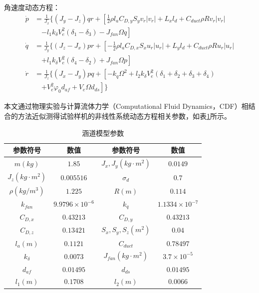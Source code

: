 角速度动态方程：
\begin{equation}
    \begin{aligned}
        \dot{p}  &=\frac{1}{J_x}\Bigg\{ (J_y-J_z)qr+
        \left[\frac{1}{2}\rho{l_a} C_{D,y}S_yv_r|v_r|+L_xl_d+C_{duct}\rho{R}
        v_r|v_r| \right.\\
        & \quad\left.- l_1k_\delta V_e^2(\delta_1 - \delta_3)-J_{fan}\Omega{q}\right] \\
        \dot{q}  &=\frac{1}{J_y}\Bigg\{ (J_z-J_x)pr+
        \left[-\frac{1}{2}\rho{l_a} C_{D,x}S_xu_r|u_r|+L_yl_d+C_{duct}\rho{R}
        u_r|u_r| \right.\\
        & \quad\left.+ l_1k_\delta V_e^2(\delta_4 - \delta_2)+J_{fan}\Omega{p}\right] \\
        \dot{r}  &=\frac{1}{J_z}\Bigg\{ (J_x-J_y)pq+
        \left[-k_q\Omega^2 +l_2k_\delta V_e^2(\delta_1 + \delta_2 + \delta_3 + \delta_4)\right.\\
        & \quad\left.+V_e^2\varphi_0d_{af}+V_e\Omega{d_{ds}}\right]
        \Bigg\}
    \end{aligned}
    \label{eq_43}
\end{equation}

本文通过物理实验与计算流体力学（Computational Fluid Dynamics，CDF）相结合的方法近似测得试验样机的非线性系统动态方程相关参数，如表\ref{DFUAV_parameters}所示。

\begin{table}
	\caption{\label{DFUAV_parameters}涵道模型参数}
	\centering
	\small 
	\begin{tabular}{cccc}
		\hline 
		参数符号 & 数值                & 参数符号 & 数值                 \tabularnewline
		\hline 
		$m(kg)$   & $1.85$ 		     & $J_x,J_y(kg\cdot{m}^2)$   & $0.0149         $ \tabularnewline
		$J_z(kg\cdot{m}^2)$   & $0.005516$ & $\sigma_d$   & $0.7$ \tabularnewline
        $\rho(kg/m^3)$   & $1.225$ & $R(m)$   & $0.114$ \tabularnewline
        $k_{fan}$   & $9.9796\times10^{-6}$ & $k_q$   & $1.1334\times10^{-7}$ \tabularnewline
        $C_{D,x}$   & $0.43213$ & $C_{D,y}$   & $0.43213$ \tabularnewline
        $C_{D,z}$   & $0.13421$ & $S_x,S_y,S_z(m^2)$   & $0.04$ \tabularnewline
        $l_a(m)$   & $0.1121$ & $C_{duct}$   & $0.78497$ \tabularnewline
        $k_{\delta}$   & $0.0073$ & $J_{fan}(kg\cdot{m}^2)$   & $3.7\times10^{-5}$ \tabularnewline
        $d_{af}$   & $0.01495$ & $d_{ds}$   & $0.01495$ \tabularnewline
        $l_1(m)$   & $0.1708$ & $l_2(m)$   & $0.0066$ \tabularnewline
		\hline 
	\end{tabular}
\end{table}

